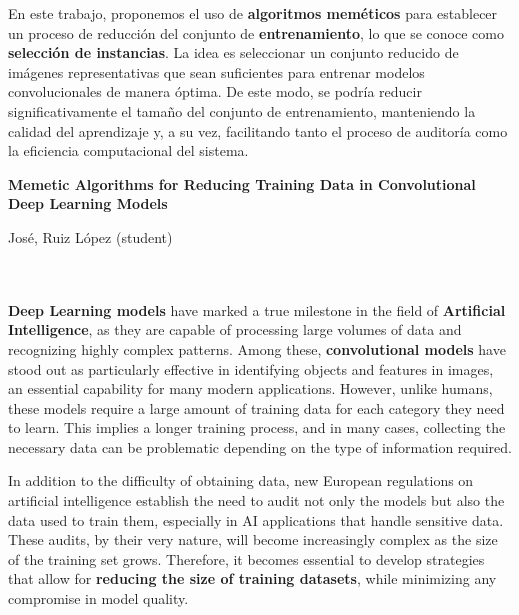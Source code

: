 En este trabajo, proponemos el uso de \textbf{algoritmos meméticos} para establecer un proceso de reducción del conjunto de
\textbf{entrenamiento}, lo que se conoce como \textbf{selección de instancias}.
La idea es seleccionar un conjunto reducido de imágenes representativas que sean suficientes para entrenar modelos convolucionales de manera óptima.
De este modo, se podría reducir significativamente el tamaño del conjunto de entrenamiento, manteniendo la calidad
del aprendizaje y, a su vez, facilitando tanto el proceso de auditoría como la eficiencia computacional del sistema.


\cleardoublepage


\thispagestyle{empty}


\begin{center}
       {\large\bfseries Memetic Algorithms for Reducing Training Data in Convolutional Deep Learning Models}\\
\end{center}
\begin{center}
       José, Ruiz López (student)\\
\end{center}

\\

\vspace{0.7cm}
\\

\textbf{Deep Learning models} have marked a true milestone in the field of \textbf{Artificial Intelligence}, as they are capable of
processing large volumes of data and recognizing highly complex patterns.
Among these, \textbf{convolutional models} have stood out as particularly effective in identifying objects and
features in images, an essential capability for many modern applications.
However, unlike humans, these models require a large amount of training data for each category they need to learn.
This implies a longer training process, and in many cases, collecting the necessary data can be problematic depending
on the type of information required.

In addition to the difficulty of obtaining data, new European regulations on artificial intelligence establish the need to
audit not only the models but also the data used to train them, especially in AI applications that handle sensitive data.
These audits, by their very nature, will become increasingly complex as the size of the training set grows.
Therefore, it becomes essential to develop strategies that allow for \textbf{reducing the size of training datasets},
while minimizing any compromise in model quality.

